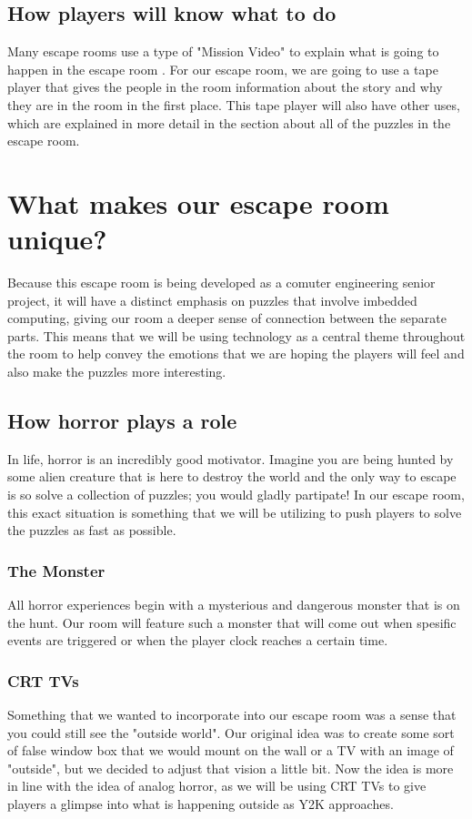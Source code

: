 \documentclass[conference]{IEEEtran}
\begin{document}
\subsection*{How players will know what to do}
Many escape rooms use a type of "Mission Video" to explain what is going to happen in the escape room \cite{whatIsAnEscapeRoom}.
For our escape room, we are going to use a tape player that gives the people in the room information about
the story and why they are in the room in the first place. This tape player will also have other uses, which are
explained in more detail in the section about all of the puzzles in the escape room.


\section{What makes our escape room unique?}
Because this escape room is being developed as a comuter engineering senior project, it will have a distinct emphasis
on puzzles that involve imbedded computing, giving our room a deeper sense of connection between the separate parts.
This means that we will be using technology as a central theme throughout the room to help convey the emotions that we
are hoping the players will feel and also make the puzzles more interesting.

\subsection*{How horror plays a role}
In life, horror is an incredibly good motivator. Imagine you are being hunted by some alien creature that is here to
destroy the world and the only way to escape is so solve a collection of puzzles; you would gladly partipate!
In our escape room, this exact situation is something that we will be utilizing to push players to solve the puzzles
as fast as possible.

\subsubsection*{The Monster}
All horror experiences begin with a mysterious and dangerous monster that is on the hunt. Our room will feature such a monster
that will come out when spesific events are triggered or when the player clock reaches a certain time.

\subsubsection*{CRT TVs}
Something that we wanted to incorporate into our escape room was a sense that you could still see the
"outside world". Our original idea was to create some sort of false window box that we would mount on
the wall or a TV with an image of "outside", but we decided to adjust that vision a little bit.
Now the idea is more in line with the idea of analog horror, as we will be using CRT TVs to
give players a glimpse into what is happening outside as Y2K approaches.
\end{document}
